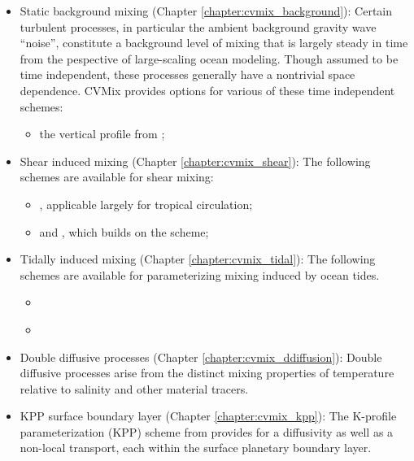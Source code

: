 \begin{itemize}

\item {\sc Static background mixing} (Chapter
  \ref{chapter:cvmix_background}): Certain turbulent processes, in
  particular the ambient background gravity wave ``noise'', constitute
  a background level of mixing that is largely steady in time from the
  pespective of large-scaling ocean modeling.  Though assumed to be
  time independent, these processes generally have a nontrivial space
  dependence.  CVMix provides options for various of these time
  independent schemes:
\begin{itemize}
\item the vertical profile from \cite{BryanLewis1979};
\end{itemize}


\item {\sc Shear induced mixing} (Chapter \ref{chapter:cvmix_shear}):
  The following schemes are available for shear mixing:
 \begin{itemize}
 \item \cite{PPvmix}, applicable largely for tropical circulation;
 \item \cite{LargeKPP} and \cite{Large_Gent1999}, which builds on the
   \cite{PPvmix} scheme;
  \end{itemize}


\item {\sc Tidally induced mixing} (Chapter
  \ref{chapter:cvmix_tidal}): The following schemes are available for
  parameterizing mixing induced by ocean tides.
  \begin{itemize}
   \item \cite{Simmonsetal2004} 
   \item \cite{Melet_etal_2013}
\end{itemize}


\item {\sc Double diffusive processes} (Chapter
  \ref{chapter:cvmix_ddiffusion}): Double diffusive processes arise
  from the distinct mixing properties of temperature relative to
  salinity and other material tracers.

\item {\sc KPP surface boundary layer} (Chapter
  \ref{chapter:cvmix_kpp}): The K-profile parameterization (KPP)
  scheme from \cite{LargeKPP} provides for a diffusivity as well as a
  non-local transport, each within the surface planetary boundary
  layer.


\end{itemize}
